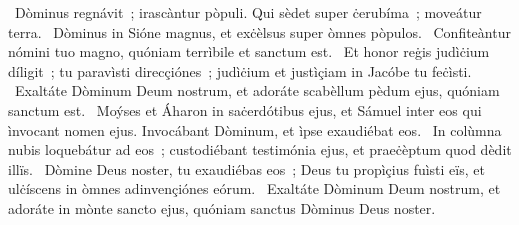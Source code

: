 \psalmChapterWithInscription{}
{ }
{%
~Dòminus regnávit~; irascàntur pòpuli. Qui sèdet super ċerubíma~; moveátur terra. 
~Dòminus in Sióne magnus, et exċèlsus super òmnes pòpulos. 
~Confiteàntur nómini tuo magno, quóniam terrìbile et sanctum est. 
~Et honor reġis judìċium díligit~; tu paravìsti direcçiónes~; judìċium et justìçiam in Jacóbe tu feċìsti. 
~Exaltáte Dòminum Deum nostrum, et adoráte scabèllum pèdum ejus, quóniam sanctum est. 
~Moýses et Áharon in saċerdótibus ejus, et Sámuel inter eos qui ìnvocant nomen ejus. Invocábant Dòminum, et ìpse exaudiébat eos. 
~In colùmna nubis loquebátur ad eos~; custodiébant testimónia ejus, et praeċèptum quod dèdit illïs. 
~Dòmine Deus noster, tu exaudiébas eos~; Deus tu propìçius fuìsti eïs, et ulċíscens in òmnes adinvençiónes eórum. 
~Exaltáte Dòminum Deum nostrum, et adoráte in mònte sancto ejus, quóniam sanctus Dòminus Deus noster. 
}
